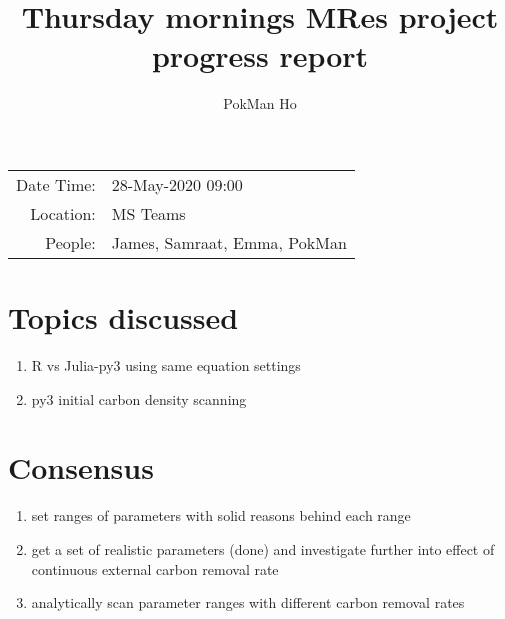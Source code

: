 \documentclass[a4paper,11pt]{article}
\title{Thursday mornings MRes project progress report}
\author{PokMan Ho}
\date{}
\begin{document}
    \maketitle
    
    \begin{tabular}{rl}
        Date Time: & 28-May-2020 09:00 \\
        Location: & MS Teams \\
        People: & James, Samraat, Emma, PokMan \\
    \end{tabular}
    
    \section{Topics discussed}
    \begin{enumerate}
        \item R vs Julia-py3 using same equation settings
        \item py3 initial carbon density scanning
    \end{enumerate}
    
    \section{Consensus}
    \begin{enumerate}
        \item set ranges of parameters with solid reasons behind each range
        \item get a set of realistic parameters (done) and investigate further into effect of continuous external carbon removal rate
        \item analytically scan parameter ranges with different carbon removal rates
    \end{enumerate}
\end{document}
